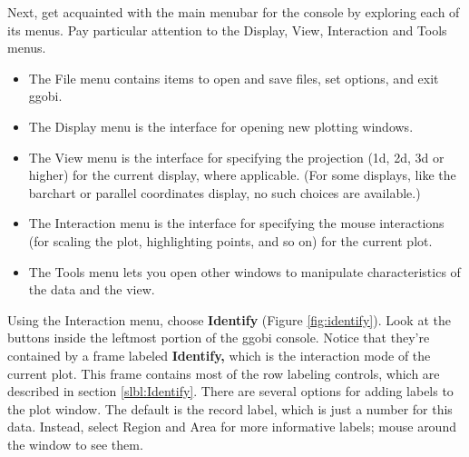 \documentclass[11pt]{article}
\def\Widget#1{\textbf{#1}}
\begin{document}
Next, get acquainted with the main menubar for the console by
exploring each of its menus.  Pay particular attention to the
Display, View, Interaction and Tools menus.

\begin {itemize}
\item The File menu contains items to open and save files, set options,
  and exit ggobi.
\item The Display menu is the interface for opening new plotting
  windows.
\item The View menu is the interface for specifying the
  projection (1d, 2d, 3d or higher) for the current display, where
  applicable.  (For some displays, like the barchart or parallel
  coordinates display, no such choices are available.)
\item The Interaction menu is the interface for specifying the mouse
  interactions (for scaling the plot, highlighting points, and so on)
  for the current plot.
\item The Tools menu lets you open other windows to manipulate
  characteristics of the data and the view.
\end {itemize}

Using the Interaction menu, choose \Widget{Identify} (Figure
\ref{fig:identify}). Look at the buttons inside the leftmost portion
of the ggobi console. Notice that they're contained by a frame labeled
\Widget{Identify,} which is the interaction mode of the current plot.
This frame contains most of the row labeling controls, which are
described in section \ref{slbl:Identify}. There are several options
for adding labels to the plot window. The default is the record label,
which is just a number for this data.  Instead, select Region and Area
for more informative labels; mouse around the window to see them.
\end{document}
